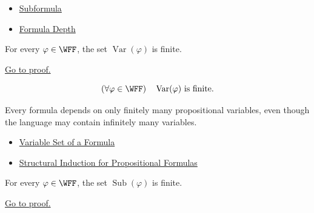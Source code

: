 \begin{dependencies}
\begin{itemize}
  \item \hyperref[def:subformula-propositional-logic]{Subformula}
  \item \hyperref[def:formula-depth-propositional-logic]{Formula Depth}
\end{itemize}
\end{dependencies}
\begin{tcolorbox}[colback=lembox, colframe=lemborder, arc=2pt,
  left=6pt, right=6pt, top=4pt, bottom=4pt,
  title={\small\textbf{Lemma (Finiteness of Variables in a Formula)}},
  fonttitle=\small\bfseries]
\begin{lemma}
\label{lem:finiteness-of-variables-propositional-formulas}
For every \(\varphi\in\WFF\), the set \(\operatorname{Var}(\varphi)\) is finite.

\noindent\hyperref[prf:finiteness-of-variables-propositional-formulas]{Go to proof.}
\end{lemma}
\end{tcolorbox}

\begin{remark*}
\[
(\forall\varphi\in\WFF)\quad
\operatorname{Var}(\varphi)\text{ is finite}.
\]
\end{remark*}

\begin{remark*}[Interpretation]
Every formula depends on only finitely many propositional variables, even though the language may contain infinitely many variables.
\end{remark*}

\begin{dependencies}
\begin{itemize}
  \item \hyperref[def:formula-variable-set-propositional-logic]{Variable Set of a Formula}
  \item \hyperref[thm:structural-induction-propositional-formulas]{Structural Induction for Propositional Formulas}
\end{itemize}
\end{dependencies}
\begin{tcolorbox}[colback=lembox, colframe=lemborder, arc=2pt,
  left=6pt, right=6pt, top=4pt, bottom=4pt,
  title={\small\textbf{Lemma (Finiteness of Subformulas)}},
  fonttitle=\small\bfseries]
\begin{lemma}
\label{lem:finiteness-of-subformulas-propositional-formulas}
For every \(\varphi\in\WFF\), the set \(\operatorname{Sub}(\varphi)\) is finite.

\noindent\hyperref[prf:finiteness-of-subformulas-propositional-formulas]{Go to proof.}
\end{lemma}
\end{tcolorbox}

